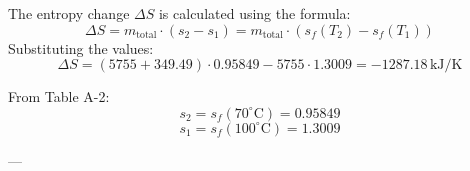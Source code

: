 The entropy change \( \Delta S \) is calculated using the formula:  
\[
\Delta S = m_{\text{total}} \cdot (s_2 - s_1) = m_{\text{total}} \cdot \left( s_f(T_2) - s_f(T_1) \right)
\]  
Substituting the values:  
\[
\Delta S = (5755 + 349.49) \cdot 0.95849 - 5755 \cdot 1.3009 = -1287.18 \, \text{kJ/K}
\]  

From Table A-2:  
\[
s_2 = s_f(70^\circ\text{C}) = 0.95849
\]  
\[
s_1 = s_f(100^\circ\text{C}) = 1.3009
\]  

---